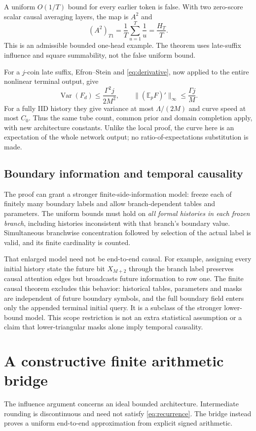 \documentclass[11pt,letterpaper]{article}
\theoremstyle{definition}\newtheorem{definition}[theorem]{Definition}
\theoremstyle{remark}\newtheorem{remark}[theorem]{Remark}
\newcommand{\E}{\mathbb{E}}
\begin{document}
A uniform $O(1/T)$ bound for every earlier token is false. With two zero-score scalar causal averaging layers, the map is $A^2$ and
\begin{equation}\label{eq:counterexample}
 (A^2)_{T1}=\frac1T\sum_{u=1}^T\frac1u=\frac{H_T}{T}.
\end{equation}
This is an admissible bounded one-head example. The theorem uses late-suffix influence and square summability, not the false uniform bound.

For a $j$-coin late suffix, Efron--Stein and \eqref{eq:derivative}, now applied to the entire nonlinear terminal output, give
\[
 \operatorname{Var}(F_d)\le\frac{\Gamma^2j}{2M^2},
 \qquad \| (\E_pF)'\|_\infty\le\frac{\Gamma j}{M}.
\]
For a fully IID history they give variance at most $\Lambda/(2M)$ and curve speed at most $C_0$. Thus the same tube count, common prior and domain completion apply, with new architecture constants. Unlike the local proof, the curve here is an expectation of the whole network output; no ratio-of-expectations substitution is made.

\subsection{Boundary information and temporal causality}
The proof can grant a stronger finite-side-information model: freeze each of finitely many boundary labels and allow branch-dependent tables and parameters. The uniform bounds must hold on \emph{all formal histories in each frozen branch}, including histories inconsistent with that branch's boundary value. Simultaneous branchwise concentration followed by selection of the actual label is valid, and its finite cardinality is counted.

That enlarged model need not be end-to-end causal. For example, assigning every initial history state the future bit $X_{M+2}$ through the branch label preserves causal attention edges but broadcasts future information to row one. The finite causal theorem excludes this behavior: historical tables, parameters and masks are independent of future boundary symbols, and the full boundary field enters only the appended terminal initial query. It is a subclass of the stronger lower-bound model. This scope restriction is not an extra statistical assumption or a claim that lower-triangular masks alone imply temporal causality.

\section{A constructive finite arithmetic bridge}\label{sec:arithmetic}
The influence argument concerns an ideal bounded architecture. Intermediate rounding is discontinuous and need not satisfy \eqref{eq:recurrence}. The bridge instead proves a uniform end-to-end approximation from explicit signed arithmetic.
\end{document}
